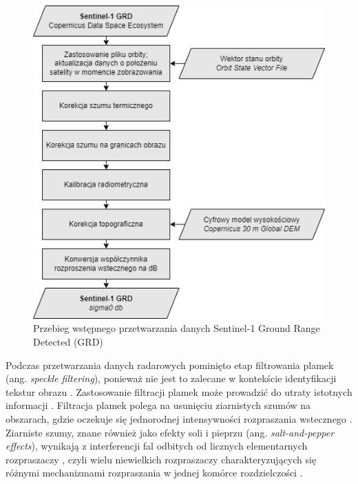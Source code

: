 \documentclass{amuthesis}
\begin{document}
\begin{figure}[t]

{\centering \includegraphics[width=4.6875in,height=\textheight]{figures/sentinel1_workflow.drawio.png}

}

\caption{\label{fig-rycina-s1-workflow}Przebieg wstępnego przetwarzania
danych Sentinel-1 Ground Range Detected (GRD)}

\end{figure}

Podczas przetwarzania danych radarowych pominięto etap filtrowania
plamek (ang. \emph{speckle filtering}), ponieważ nie jest to zalecane w
kontekście identyfikacji tekstur obrazu
\autocite{filipponi_2019_s1_workflow}. Zastosowanie filtracji plamek
może prowadzić do utraty istotnych informacji
\autocite{filipponi_2019_s1_workflow}. Filtracja plamek polega na
usunięciu ziarnistych szumów na obszarach, gdzie oczekuje się
jednorodnej intensywności rozpraszania wstecznego
\autocite{sentinel1_lulc}. Ziarniste szumy, znane również jako efekty
soli i pieprzu (ang. \emph{salt-and-pepper effects}), wynikają z
interferencji fal odbitych od licznych elementarnych rozpraszaczy
\autocite{lee_1994_speckle_filtering}, czyli wielu niewielkich
rozpraszaczy charakteryzujących się różnymi mechanizmami rozpraszania w
jednej komórce rozdzielczości \autocite{sentinel1_lulc}.
\end{document}
